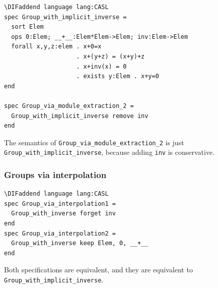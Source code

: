 \documentclass[10pt,fleqn,final]{scrreprt}
\newcommand*{\syntax}[1]{\texttt{#1}}
\newcommand{\sssclause}[1]{\subsubsection{#1}}
\providecommand{\DIFaddbegin}{} %
\providecommand{\DIFaddend}{} %
\providecommand{\DIFdelbegin}{} %
\providecommand{\DIFdelend}{} %
\begin{document}
\DIFdelbegin %
\DIFdelend \DIFaddbegin \begin{lstlisting}[basicstyle=\ttfamily,language=dolText,alsolanguage=CASL,escapechar=@,mathescape]
\DIFaddend language lang:CASL
spec Group_with_implicit_inverse =
  sort Elem
  ops 0:Elem; __+__:Elem*Elem->Elem; inv:Elem->Elem
  forall x,y,z:elem . x+0=x
                    . x+(y+z) = (x+y)+z
                    . x+inv(x) = 0
                    . exists y:Elem . x+y=0
end

spec Group_via_module_extraction_2 =
  Group_with_implicit_inverse remove inv
end
\end{lstlisting}
The semantics of \syntax{Group\_via\_module\_extraction\_2} is just
\syntax{Group\_with\_implicit\_inverse}, because adding \texttt{inv}
is conservative.
\medskip

\sssclause{Groups via interpolation}

\DIFdelbegin %
\DIFdelend \DIFaddbegin \begin{lstlisting}[basicstyle=\ttfamily,language=dolText,alsolanguage=CASL,escapechar=@,mathescape]
\DIFaddend language lang:CASL
spec Group_via_interpolation1 =
  Group_with_inverse forget inv
end
spec Group_via_interpolation2 =
  Group_with_inverse keep Elem, 0, __+__
end
\end{lstlisting}
Both specifications are equivalent, and they 
are equivalent to \syntax{Group\_with\_implicit\_inverse}.
\medskip
\end{document}
